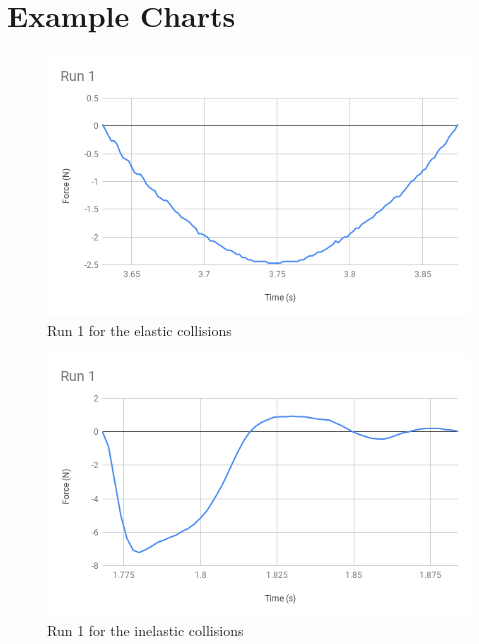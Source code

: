 \section{Example Charts}
%
\begin{figure}[ht]
    \centering
    \includegraphics[scale=0.71]{image/08-impulse/Run1-elastic.png}
    \caption{Run 1 for the elastic collisions}
    \label{figure.08.run.1.elastic}
\end{figure}
%
\begin{figure}[ht]
    \centering
    \includegraphics[scale=0.71]{image/08-impulse/Run1-inelastic.png}
    \caption{Run 1 for the inelastic collisions}
    \label{figure.08.run.1}
\end{figure}
%
